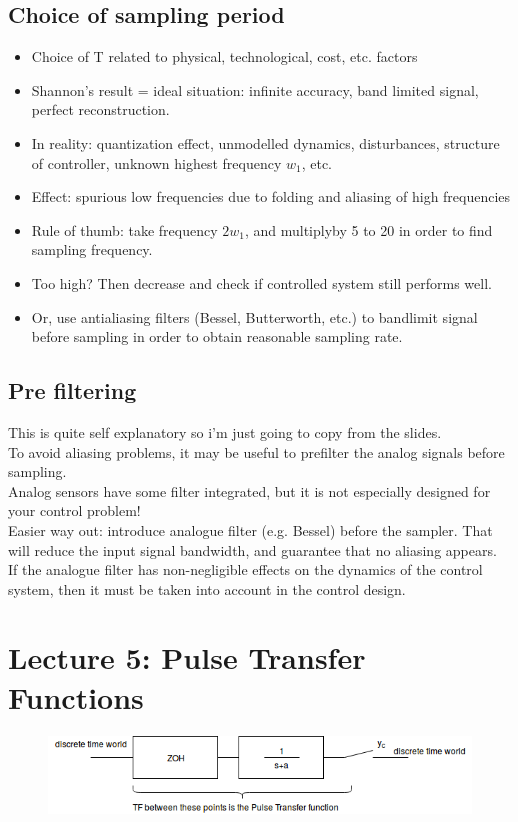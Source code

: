 \documentclass[a4paper,11pt]{article}
\begin{document}
	\subsection{Choice of sampling period}
	\begin{itemize}   
		\item Choice of T related to physical, technological, cost, etc. factors
		\item Shannon's result = ideal situation: infinite accuracy, band limited signal, perfect reconstruction.
		\item In reality: quantization effect, unmodelled dynamics, disturbances, structure of controller, unknown highest frequency $w_1$, etc.
		\item Effect: spurious low frequencies due to folding and aliasing of high frequencies
		\item Rule of thumb: take frequency $2w_1$, and multiplyby 5 to 20 in order to find sampling frequency.
		\item Too high? Then decrease and check if controlled system still performs well.
		\item Or, use antialiasing filters (Bessel, Butterworth, etc.) to bandlimit signal before sampling in order to obtain reasonable sampling rate.
	\end{itemize}
	
	\subsection{Pre filtering} 
	This is quite self explanatory so i'm just going to copy from the slides.\\	To avoid aliasing problems, it may be useful to
prefilter the analog signals before sampling.\\
	Analog sensors have some filter integrated, but it is
not especially designed for your control problem!\\
Easier way out: introduce analogue filter (e.g. Bessel)
before the sampler. That will reduce the input signal
bandwidth, and guarantee that no aliasing appears.\\
If the analogue filter has non-negligible effects on the
dynamics of the control system, then it must be taken
into account in the control design.\\
	\section{Lecture 5: Pulse Transfer Functions} 
	\begin{figure}[htp]
		\centering
		\includegraphics[scale=0.6]{images/PTF}
	\end{figure}
	\FloatBarrier
	
\end{document}
